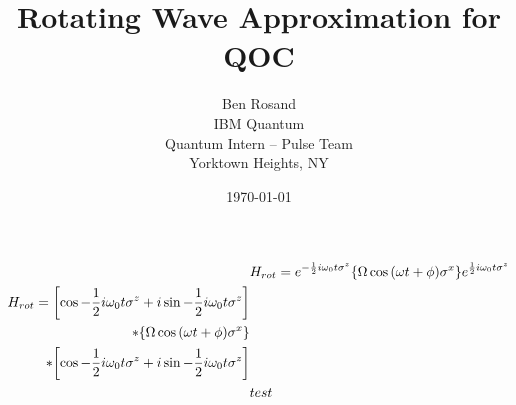 \documentclass[12pt]{article}
\title{Rotating Wave Approximation for QOC}
\author{
        Ben Rosand \\
        IBM Quantum \\
        Quantum Intern -- Pulse Team\\
        Yorktown Heights, NY
}
\date{\today}
\begin{document}
\maketitle


\begin{align}
    & H_{rot} = 
    e^{-\frac{1}{2} i \omega_0 t \sigma^z}
    \qty{\Omega \cos{(\omega t + \phi)}\sigma^x}
    e^{\frac{1}{2} i \omega_0 t \sigma^z} \\
    \begin{split}
    H_{rot} = 
    \qty[\cos{-\frac{1}{2} i \omega_0 t \sigma^z} + i
    \sin{-\frac{1}{2} i \omega_0 t \sigma^z}] \\
    * \qty{\Omega \cos{(\omega t + \phi)}\sigma^x} \\
    * \qty[\cos{-\frac{1}{2} i \omega_0 t \sigma^z} + i
    \sin{-\frac{1}{2} i \omega_0 t \sigma^z}] \\
    \end{split} \\
    & test
\end{align}
\end{document}
